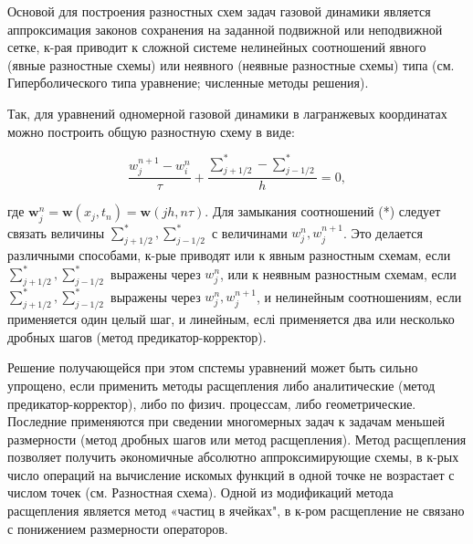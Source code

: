 \documentclass[10pt]{article}
\begin{document}
Основой для построения разностных схем задач газовой динамики является аппроксимация законов сохранения на заданной подвижной или неподвижной сетке, к-рая приводит к сложной системе нелинейных соотношений явного (явные разностные схемы) или неявного (неявные разностные схемы) типа (см. Гиперболического типа уравнение; численные методы решения).



Так, для уравнений одномерной газовой динамики в лагранжевых координатах можно построить общую разностную схему в виде:



\[

\frac{w_{j}^{n+1}-w_{i}^{n}}{\tau}+\frac{\sum_{j+1 / 2}^{*}-\sum_{j-1 / 2}^{*}}{h}=0,

\]



где $\boldsymbol{w}_{j}^{n}=\boldsymbol{w}\left(x_{j}, t_{n}\right)=\boldsymbol{w}(j h, n \tau)$. Для замыкания соотношений (*) следует связать величины $\sum_{j+1 / 2}^{*}, \sum_{j-1 / 2}^{*}$ с величинами $w_{j}^{n}, w_{j}^{n+1}$. Это делается различными способами, к-рые приводят или к явным разностным схемам, если $\sum_{j+1 / 2}^{*}, \sum_{j-1 / 2}^{*}$ выражены через $w_{j}^{n}$, или к неявным разностным схемам, если $\sum_{j+1 / 2}^{*}, \sum_{j-1 / 2}^{*}$ выражены через $w_{j}^{n}, w_{j}^{n+1}$, и нелинейным соотношениям, если применяется один целый шаг, и линейным, еслі применяется два или несколько дробных шагов (метод предикатор-корректор).



Решение получающейся при этом спстемы уравнений может быть сильно упрощено, если применить методы расщепления либо аналитические (метод предикатор-корректор), либо по физич. процессам, либо геометрические. Последние применяются при сведении многомерных задач к задачам меньшей размерности (метод дробных шагов или метод расщепления). Метод расщепления позволяет получить әкономичные абсолютно аппроксимирующие схемы, в к-рых число операций на вычисление искомых функций в одной точке не возрастает с числом точек (см. Разностная схема). Одной из модификаций метода расщепления является метод «частиц в ячейках", в к-ром расщепление не связано с понижением размерности операторов.
\end{document}

